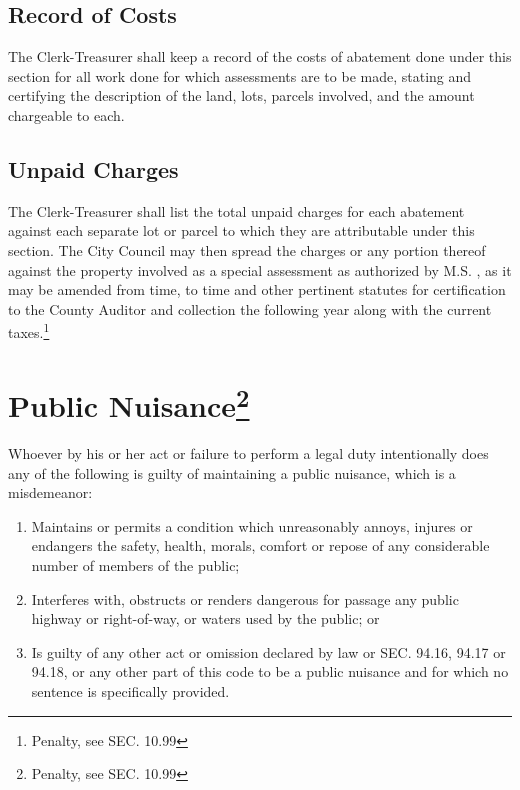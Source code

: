 \subsection{Record of Costs}
The Clerk-Treasurer shall keep a record of the costs of abatement done under this section for all work done for which assessments are to be made, stating and certifying the description of the land, lots, parcels involved, and the amount chargeable to each.
\subsection{Unpaid Charges}
The Clerk-Treasurer shall list the total unpaid charges for each abatement against each separate lot or parcel to which they are attributable under this section. The City Council may then spread the charges or any portion thereof against the property involved as a special assessment as authorized by M.S. , as it may be amended from time, to time and other pertinent statutes for certification to the County Auditor and collection the following year along with the current taxes.\footnote{Penalty, see SEC. 10.99}\\



\setcounter{section}{14}
\section{Public Nuisance\footnote{Penalty, see SEC. 10.99}}
Whoever by his or her act or failure to perform a legal duty intentionally does any of the following is guilty of maintaining a public nuisance, which is a misdemeanor:
\begin{enumerate}[{\indent}A)]
    \item Maintains or permits a condition which unreasonably annoys, injures or endangers the safety, health, morals, comfort or repose of any considerable number of members of the public;
    \item Interferes with, obstructs or renders dangerous for passage any public highway or right-of-way, or waters used by the public; or
    \item Is guilty of any other act or omission declared by law or SEC. 94.16, 94.17 or 94.18, or any other part of this code to be a public nuisance and for which no sentence is specifically provided.
\end{enumerate}
